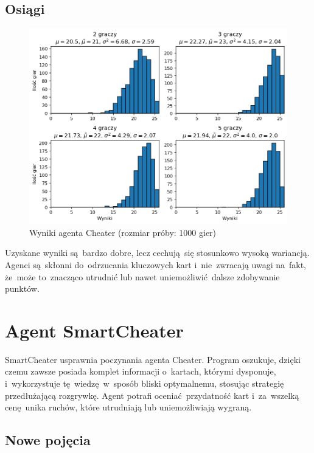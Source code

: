 \documentclass[declaration,shortabstract,inz]{iithesis}
\begin{document}
\subsection*{Osiągi}

\begin{figure}[H]
	\centering
	\captionsetup{format=hang}
	\includegraphics[width=\textwidth,height=\textheight,keepaspectratio]{Cheater.png}
	\caption[Caption]{Wyniki agenta Cheater (rozmiar próby: 1000 gier)}
	\label{fig:Cheater}
\end{figure}

Uzyskane wyniki są~bardzo dobre, lecz cechują~się stosunkowo wysoką wariancją. Agenci są~skłonni do~odrzucania kluczowych kart i~nie~zwracają uwagi na~fakt, że~może to~znacząco utrudnić lub nawet uniemożliwić dalsze zdobywanie punktów.

\section{Agent SmartCheater}

SmartCheater usprawnia poczynania agenta Cheater. Program oszukuje, dzięki czemu zawsze posiada komplet informacji o~kartach, którymi dysponuje, i~wykorzystuje tę~wiedzę w~sposób bliski optymalnemu, stosując strategię przedłużającą rozgrywkę. Agent potrafi oceniać przydatność kart i~za~wszelką cenę unika ruchów, które utrudniają lub uniemożliwiają wygraną.

\subsection*{Nowe pojęcia}
\end{document}
